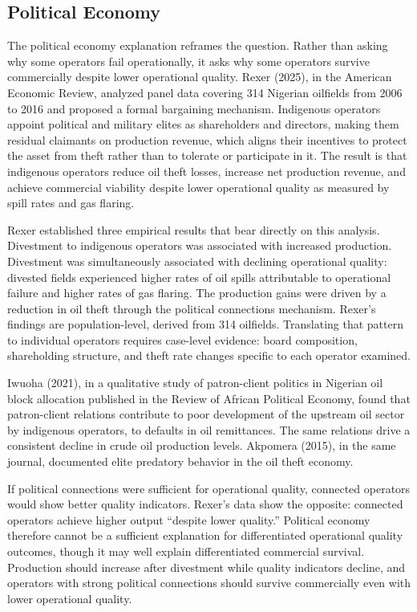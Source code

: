 \hypertarget{political-economy}{%
\subsection{Political Economy}\label{political-economy}}

The political economy explanation reframes the question. Rather than
asking why some operators fail operationally, it asks why some operators
survive commercially despite lower operational quality. Rexer (2025), in
the American Economic Review, analyzed panel data covering 314 Nigerian
oilfields from 2006 to 2016 and proposed a formal bargaining mechanism.
Indigenous operators appoint political and military elites as
shareholders and directors, making them residual claimants on production
revenue, which aligns their incentives to protect the asset from theft
rather than to tolerate or participate in it. The result is that
indigenous operators reduce oil theft losses, increase net production
revenue, and achieve commercial viability despite lower operational
quality as measured by spill rates and gas flaring.

Rexer established three empirical results that bear directly on this
analysis. Divestment to indigenous operators was associated with
increased production. Divestment was simultaneously associated with
declining operational quality: divested fields experienced higher rates
of oil spills attributable to operational failure and higher rates of
gas flaring. The production gains were driven by a reduction in oil
theft through the political connections mechanism. Rexer's findings are
population-level, derived from 314 oilfields. Translating that pattern
to individual operators requires case-level evidence: board composition,
shareholding structure, and theft rate changes specific to each operator
examined.

Iwuoha (2021), in a qualitative study of patron-client politics in
Nigerian oil block allocation published in the Review of African
Political Economy, found that patron-client relations contribute to poor
development of the upstream oil sector by indigenous operators, to
defaults in oil remittances. The same relations drive a consistent
decline in crude oil production levels. Akpomera (2015), in the same
journal, documented elite predatory behavior in the oil theft economy.

If political connections were sufficient for operational quality,
connected operators would show better quality indicators. Rexer's data
show the opposite: connected operators achieve higher output ``despite
lower quality.'' Political economy therefore cannot be a sufficient
explanation for differentiated operational quality outcomes, though it
may well explain differentiated commercial survival. Production should
increase after divestment while quality indicators decline, and
operators with strong political connections should survive commercially
even with lower operational quality.

